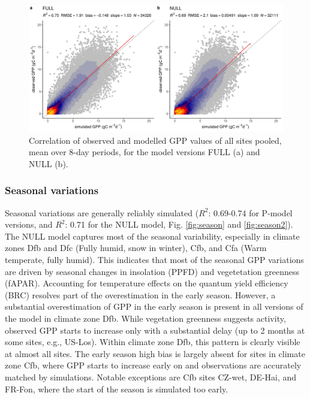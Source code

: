 \documentclass{myreport}
\newcommand{\rsq}{$R^2$}
\begin{document}
\begin{figure}[!ht]
    \includegraphics[width=\textwidth]{fig/modobs_xdaily.pdf}
    \caption{Correlation of observed and modelled GPP values of all sites pooled, mean over 8-day periods, for the model versions FULL (a) and NULL (b).}
    \label{fig:modobs_xdaily}
\end{figure}

\subsubsection{Seasonal variations}
\label{sec:results_seasonal}
Seasonal variations are generally reliably simulated (\rsq : 0.69-0.74 for P-model versions, and \rsq : 0.71 for the NULL model, Fig. \ref{fig:season} and \ref{fig:season2}). The NULL model captures most of the seasonal variability, especially in climate zones Dfb and Dfc (Fully humid, snow in winter), Cfb, and Cfa (Warm temperate, fully humid). This indicates that most of the  seasonal GPP variations are driven by seasonal changes in insolation (PPFD) and vegetetation greenness (fAPAR). Accounting for temperature effects on the quantum yield efficiency (BRC) resolves part of the overestimation in the early season. However, a substantial overestimation of GPP in the early season is present in all versions of the model in climate zone Dfb. While vegetation greenness suggests activity, observed GPP starts to increase only with a substantial delay (up to 2 months at some sites, e.g., US-Los). Within climate zone Dfb, this pattern is clearly visible at almost all sites. The early season high bias is largely absent for sites in climate zone Cfb, where GPP starts to increase early on and observations are accurately matched by simulations. Notable exceptions are Cfb sites CZ-wet, DE-Hai, and FR-Fon, where the start of the season is simulated too early.
\end{document}
